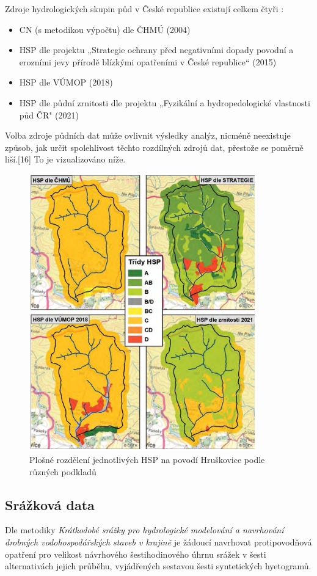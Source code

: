 \documentclass[a4paper,oneside,12pt]{book}
\begin{document}
Zdroje hydrologických skupin půd v České republice existují celkem čtyři \cite{Strouhal2022}:
\begin{itemize}
\item CN (s metodikou výpočtu) dle ČHMÚ (2004)
\item HSP dle projektu „Strategie ochrany před negativními dopady povodní a erozními jevy přírodě blízkými opatřeními v České republice“ (2015)
\item HSP dle VÚMOP (2018) 
\item HSP dle půdní zrnitosti dle projektu „Fyzikální a hydropedologické vlastnosti půd ČR" (2021)
\end{itemize}
\hspace{10mm} Volba zdroje půdních dat může ovlivnit výsledky analýz, nicméně neexistuje způsob, jak určit spolehlivost těchto rozdílných zdrojů dat, přestože se poměrně liší.[16] To je vizualizováno níže.

\begin{figure}[H] \label{obr4}
\centering
\includegraphics[height=12cm]{pictures/HSPmapa.png}
\caption{Plošné rozdělení jednotlivých HSP na povodí Hruškovice podle různých podkladů \cite{Strouhal2022}}
\label{fig:hsp}
\end{figure}

\newpage
\subsection{Srážková data} \label{rain}
\hspace{10mm} Dle metodiky \textit{Krátkodobé srážky pro hydrologické modelování a navrhování drobných vodohospodářských staveb v krajině} \cite{MNYDGwleJOjKLRU2} je žádoucí navrhovat protipovodňová opatření pro velikost návrhového šestihodinového úhrnu srážek v šesti alternativách jejich průběhu, vyjádřených sestavou šesti syntetických hyetogramů. 
\end{document}
